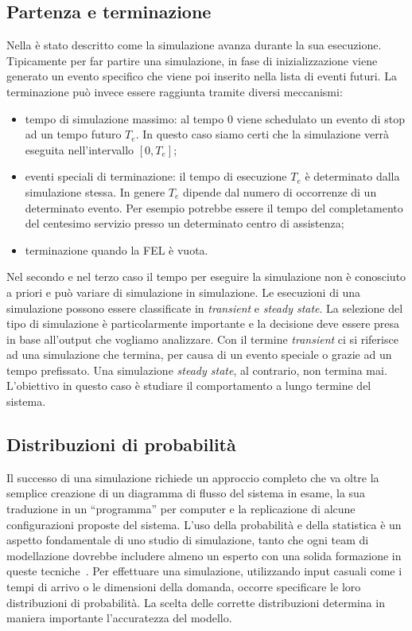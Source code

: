 \documentclass[12pt,a4paper,openright,twoside]{book}
\begin{document}
\subsection{Partenza e terminazione}
Nella  è stato descritto come la simulazione avanza durante la sua esecuzione. Tipicamente per far partire una simulazione, in fase di inizializzazione viene generato un evento specifico che viene poi inserito nella lista di eventi futuri. 
La terminazione può invece essere raggiunta tramite diversi meccanismi: 
\begin{itemize}
    \item tempo di simulazione massimo: al tempo 0 viene schedulato un evento di stop ad un tempo futuro $T_e$. In questo caso siamo certi che la simulazione verrà eseguita nell'intervallo $[0, T_e]$; 
    \item eventi speciali di terminazione: il tempo di esecuzione $T_e$ è determinato dalla simulazione stessa. In genere $T_e$ dipende dal numero di occorrenze di un determinato evento. Per esempio potrebbe essere il tempo del completamento del centesimo servizio presso un determinato centro di assistenza;  
    \item terminazione quando la FEL è vuota.
\end{itemize}
Nel secondo e nel terzo caso il tempo per eseguire la simulazione non è conosciuto a priori e può variare di simulazione in simulazione.
Le esecuzioni di una simulazione possono essere classificate in \textit{transient} e \textit{steady state}. La selezione del tipo di simulazione è particolarmente importante e la decisione deve essere presa in base all'output che vogliamo analizzare. Con il termine \textit{transient} ci si riferisce ad una simulazione che termina, per causa di un evento speciale o grazie ad un tempo prefissato. 
Una simulazione \textit{steady state}, al contrario, non termina mai. L'obiettivo in questo caso è studiare il comportamento a lungo termine del sistema. 

\subsection{Distribuzioni di probabilità}
Il successo di una simulazione richiede un approccio completo che va oltre la semplice creazione di un diagramma di flusso del sistema in esame, la sua traduzione in un ``programma'' per computer e la replicazione di alcune configurazioni proposte del sistema. L'uso della probabilità e della statistica è un aspetto fondamentale di uno studio di simulazione, tanto che ogni team di modellazione dovrebbe includere almeno un esperto con una solida formazione in queste tecniche~\cite{Law15}.
Per effettuare una simulazione, utilizzando input casuali come i tempi di arrivo o le dimensioni della domanda, occorre specificare le loro distribuzioni di probabilità. La scelta delle corrette distribuzioni determina in maniera importante l'accuratezza del modello. 
\end{document}
